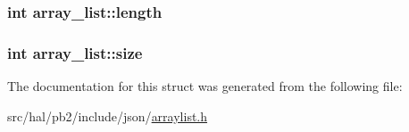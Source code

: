 \subsubsection[{\texorpdfstring{length}{length}}]{\setlength{\rightskip}{0pt plus 5cm}int array\+\_\+list\+::length}\hypertarget{structarray__list_a442fcfde196a3cc95a647f0708de814d}{}\label{structarray__list_a442fcfde196a3cc95a647f0708de814d}
\subsubsection[{\texorpdfstring{size}{size}}]{\setlength{\rightskip}{0pt plus 5cm}int array\+\_\+list\+::size}\hypertarget{structarray__list_aba48a197d3c8f1d56682da23fe883d0a}{}\label{structarray__list_aba48a197d3c8f1d56682da23fe883d0a}


The documentation for this struct was generated from the following file\+:\begin{DoxyCompactItemize}
\item 
src/hal/pb2/include/json/\hyperlink{arraylist_8h}{arraylist.\+h}\end{DoxyCompactItemize}
